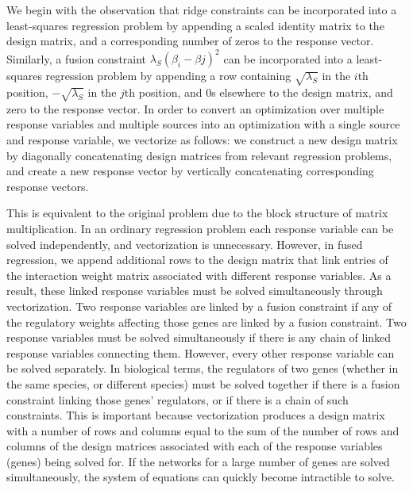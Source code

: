 \documentclass[11pt]{article}
\begin{document}
We begin with the observation that ridge constraints can be incorporated into a least-squares regression problem by appending a scaled identity matrix to the design matrix, and a corresponding number of zeros to the response vector. Similarly, a fusion constraint $\lambda_S (\beta_{i} - \beta{j})^2$ can be incorporated into a least-squares regression problem by appending a row containing $\sqrt{\lambda_S}$ in the $i$th position, $-\sqrt{\lambda_S}$ in the $j$th position, and $0$s elsewhere to the design matrix, and zero to the response vector. In order to convert an optimization over multiple response variables and multiple sources into an optimization with a single source and response variable, we vectorize as follows: we construct a new design matrix by diagonally concatenating design matrices from relevant regression problems, and create a new response vector by vertically concatenating corresponding response vectors. 


This is equivalent to the original problem due to the block structure of matrix multiplication. In an ordinary regression problem each response variable can be solved independently, and vectorization is unnecessary. However, in fused regression, we append additional rows to the design matrix that link entries of the interaction weight matrix associated with different response variables. As a result, these linked response variables must be solved simultaneously through vectorization. Two response variables are linked by a fusion constraint if any of the regulatory weights affecting those genes are linked by a fusion constraint. Two response variables must be solved simultaneously if there is any chain of linked response variables connecting them. However, every other response variable can be solved separately. In biological terms, the regulators of two genes (whether in the same species, or different species) must be solved together if there is a fusion constraint linking those genes' regulators, or if there is a chain of such constraints. This is important because vectorization produces a design matrix with a number of rows and columns equal to the sum of the number of rows and columns of the design matrices associated with each of the response variables (genes) being solved for. If the networks for a large number of genes are solved simultaneously, the system of equations can quickly become intractible to solve. 
\end{document}
